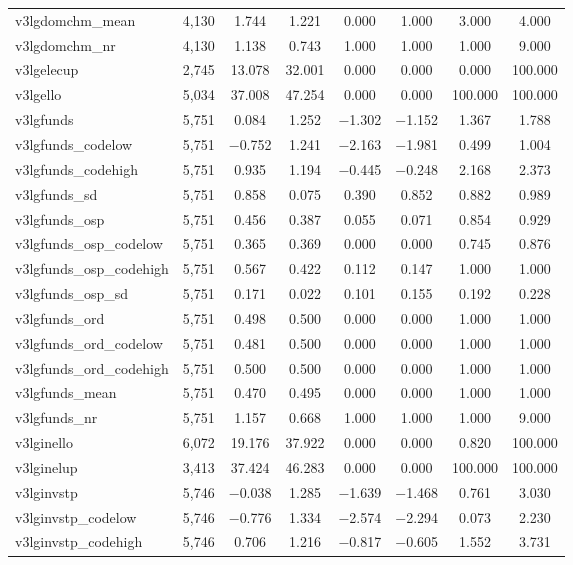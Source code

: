 \begin{table}[!htbp]
\begin{tabular}{@{\extracolsep{5pt}}lccccccc}
v3lgdomchm\_mean & 4,130 & 1.744 & 1.221 & 0.000 & 1.000 & 3.000 & 4.000 \\ 
v3lgdomchm\_nr & 4,130 & 1.138 & 0.743 & 1.000 & 1.000 & 1.000 & 9.000 \\ 
v3lgelecup & 2,745 & 13.078 & 32.001 & 0.000 & 0.000 & 0.000 & 100.000 \\ 
v3lgello & 5,034 & 37.008 & 47.254 & 0.000 & 0.000 & 100.000 & 100.000 \\ 
v3lgfunds & 5,751 & 0.084 & 1.252 & $-$1.302 & $-$1.152 & 1.367 & 1.788 \\ 
v3lgfunds\_codelow & 5,751 & $-$0.752 & 1.241 & $-$2.163 & $-$1.981 & 0.499 & 1.004 \\ 
v3lgfunds\_codehigh & 5,751 & 0.935 & 1.194 & $-$0.445 & $-$0.248 & 2.168 & 2.373 \\ 
v3lgfunds\_sd & 5,751 & 0.858 & 0.075 & 0.390 & 0.852 & 0.882 & 0.989 \\ 
v3lgfunds\_osp & 5,751 & 0.456 & 0.387 & 0.055 & 0.071 & 0.854 & 0.929 \\ 
v3lgfunds\_osp\_codelow & 5,751 & 0.365 & 0.369 & 0.000 & 0.000 & 0.745 & 0.876 \\ 
v3lgfunds\_osp\_codehigh & 5,751 & 0.567 & 0.422 & 0.112 & 0.147 & 1.000 & 1.000 \\ 
v3lgfunds\_osp\_sd & 5,751 & 0.171 & 0.022 & 0.101 & 0.155 & 0.192 & 0.228 \\ 
v3lgfunds\_ord & 5,751 & 0.498 & 0.500 & 0.000 & 0.000 & 1.000 & 1.000 \\ 
v3lgfunds\_ord\_codelow & 5,751 & 0.481 & 0.500 & 0.000 & 0.000 & 1.000 & 1.000 \\ 
v3lgfunds\_ord\_codehigh & 5,751 & 0.500 & 0.500 & 0.000 & 0.000 & 1.000 & 1.000 \\ 
v3lgfunds\_mean & 5,751 & 0.470 & 0.495 & 0.000 & 0.000 & 1.000 & 1.000 \\ 
v3lgfunds\_nr & 5,751 & 1.157 & 0.668 & 1.000 & 1.000 & 1.000 & 9.000 \\ 
v3lginello & 6,072 & 19.176 & 37.922 & 0.000 & 0.000 & 0.820 & 100.000 \\ 
v3lginelup & 3,413 & 37.424 & 46.283 & 0.000 & 0.000 & 100.000 & 100.000 \\ 
v3lginvstp & 5,746 & $-$0.038 & 1.285 & $-$1.639 & $-$1.468 & 0.761 & 3.030 \\ 
v3lginvstp\_codelow & 5,746 & $-$0.776 & 1.334 & $-$2.574 & $-$2.294 & 0.073 & 2.230 \\ 
v3lginvstp\_codehigh & 5,746 & 0.706 & 1.216 & $-$0.817 & $-$0.605 & 1.552 & 3.731 \\ 

\end{tabular}
\end{table}
